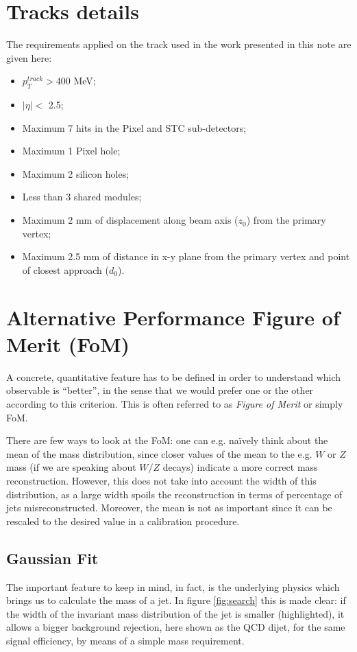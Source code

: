 \section{Tracks details}\label{sec:tracking}
The requirements applied on the track used in the work presented in this note are given here:
\begin{itemize}
 \item $p_T^{track} > 400$ MeV;
 \item $|\eta|<$ 2.5;
 \item Maximum 7 hits in the Pixel and STC sub-detectors;
 \item Maximum 1 Pixel hole;
 \item Maximum 2 silicon holes;
 \item Less than 3 shared modules;
 \item Maximum 2 mm of displacement along beam axis ($z_0$) from the primary vertex;
 \item Maximum 2.5 mm of distance in x-y plane from the primary vertex and point of closest approach ($d_0$).
\end{itemize}

\section{Alternative Performance Figure of Merit (FoM)}

A concrete, quantitative feature has to be defined in order to understand which observable is ``better'', in the sense that we would prefer one or the other according to this criterion. This is often referred to as \textit{Figure of Merit} or simply FoM.

There are few ways to look at the FoM: one can e.g. na\"ively think about the mean of the mass distribution, since closer values of the mean to the e.g. $W$ or $Z$ mass (if we are speaking about $W/Z$ decays) indicate a more correct mass reconstruction. However, this does not take into account the width of this distribution, as a large width spoils the reconstruction in terms of percentage of jets misreconstructed. Moreover, the mean is not as important since it can be rescaled to the desired value in a calibration procedure.

\subsection{Gaussian Fit}

The important feature to keep in mind, in fact, is the underlying physics which brings us to calculate the mass of a jet. In figure \ref{fig:search} this is made clear: if the width of the invariant mass distribution of the jet is smaller (highlighted), it allows a bigger background rejection, here shown as the QCD dijet, for the same signal efficiency, by means of a simple mass requirement.

